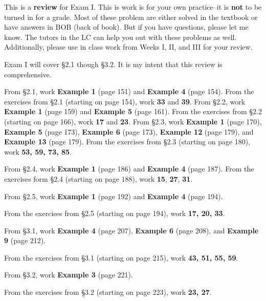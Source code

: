\documentclass[12pt,fleqn,answers]{exam}
\newcommand{\quiz}{I}
\newcommand{\term}{Spring}
\newcommand{\class}{MATH 102}
\begin{document}
\large
\vspace{0.1in}
\noindent\makebox[3.0truein][l]{\textbf{\class, \term \/ \the\year}}
\noindent \makebox[3.0truein][l]{\textbf{Review for Exam \quiz}}
\vspace{0.1in}



\vspace{0.1in}

\noindent This is a \textbf{review} for Exam I. This is work is for your own practice--it is \textbf{not} to be turned in
for a grade.  Most of these problem are either solved in the textbook or have answers in BOB (back of book).
But if you have questions, please let me know.  The tutors in the  LC can help you out with these problems as well.
Additionally, please use in class work from Weeks I, II, and III for your review.

Exam I will cover \S 2.1 though \S 3.2. It is my intent that this review is comprehensive. 

\begin{questions} 

\question From \S 2.1, work \textbf{Example 1} (page 151) and \textbf{Example 4} (page 154).
\question From the exercises from \S 2.1 (starting on page 154), work \textbf{33} and \textbf{39}.
\question From \S2.2, work \textbf{Example 1} (page 159) and \textbf{Example 5} (page 161).
\question From the exercises from \S 2.2 (starting on  page 166), work \textbf{17} and \textbf{23}.
\question From \S 2.3, work  \textbf{Example 1} (page 170), \textbf{Example 5} (page 173),
\textbf{Example 6} (page 173), \textbf{Example 12} (page 179), and \textbf{Example 13} (page 179).
\question From the exercises from \S2.3 (starting on  page 180), work \textbf{53, 59, 73, 85}.

\question From \S 2.4, work \textbf{Example 1} (page 186) and  \textbf{Example 4} (page 187).
\question From the exercises form \S 2.4 (starting on  page 188), work  \textbf{15}, \textbf{27}, \textbf{31}.

\question From \S 2.5, work \textbf{Example 1} (page 192) and \textbf{Example 4} (page 194).

\question From the exercises from \S 2.5 (starting on  page 194), work \textbf{17, 20, 33}.


\question From \S 3.1,  work \textbf{Example 4} (page 207), \textbf{Example 6} (page 208),
and \textbf{Example 9} (page 212).

\question From the exercises from \S 3.1 (starting on  page 215), work \textbf{43, 51, 55, 59}.

\question  From \S3.2, work \textbf{Example 3} (page 221).

\question From the exercises from \S 3.2 (starting on  page 223), work \textbf{23, 27}.



\end{questions}
\end{document}
